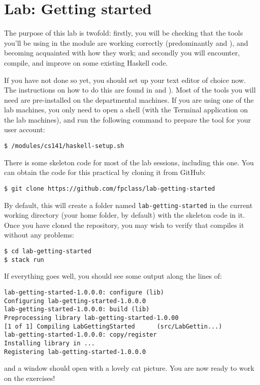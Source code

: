 \section{Lab: Getting started}

The purpose of this lab is twofold: firstly, you will be checking that the tools you'll be using in the module are working correctly (predominantly  and ), and becoming acquainted with how they work; and secondly you will encounter, compile, and improve on some existing Haskell code.


If you have not done so yet, you should set up your text editor of choice now. The instructions on how to do this are found in  and ). Most of the tools you will need are pre-installed on the departmental machines. If you are using one of the lab machines, you only need to open a shell (with the Terminal application on the lab machines), and run the following command to prepare the  tool for your user account:
\begin{verbatim}
$ /modules/cs141/haskell-setup.sh
\end{verbatim}

There is some skeleton code for most of the lab sessions, including this one. You can obtain the code for this practical by cloning it from GitHub:
\begin{verbatim}
$ git clone https://github.com/fpclass/lab-getting-started
\end{verbatim}
By default, this will create a folder named \texttt{\small lab-getting-started} in the current working directory (your home folder, by default) with the skeleton code in it. Once you have cloned the repository, you may wish to verify that  compiles it without any problems:
\begin{verbatim}
$ cd lab-getting-started
$ stack run
\end{verbatim}
If everything goes well, you should see some output along the lines of:
\begin{verbatim}
lab-getting-started-1.0.0.0: configure (lib)
Configuring lab-getting-started-1.0.0.0
lab-getting-started-1.0.0.0: build (lib)
Preprocessing library lab-getting-started-1.0.00
[1 of 1] Compiling LabGettingStarted      (src/LabGettin...)
lab-getting-started-1.0.0.0: copy/register
Installing library in ...
Registering lab-getting-started-1.0.0.0
\end{verbatim}
and a window should open with a lovely cat picture. You are now ready to work on the exercises! 

